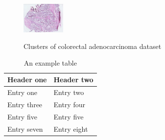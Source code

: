 \documentclass[journal=jacsat,manuscript=article]{achemso}
\begin{document}
\begin{figure}[htbp]
  \centering
  \begin{minipage}[c]{0.9\textwidth}
  {
    \includegraphics[width=0.19\textwidth]{pic/coloractal/s25_op.png}
  } 
  \end{minipage}
  \caption{Clusters of colorectal adenocarcinoma dataset}
  \label{fig:op of colorectal adenocarcinoma dataset}
\end{figure}

\newpage
\begin{table}
  \caption{An example table}
  \label{tbl:example}
  \begin{tabular}{ll}
    \hline
    Header one  & Header two  \\
    \hline
    Entry one   & Entry two   \\
    Entry three & Entry four  \\
    Entry five  & Entry five  \\
    Entry seven & Entry eight \\
    \hline
  \end{tabular}
\end{table} 
\end{document}
